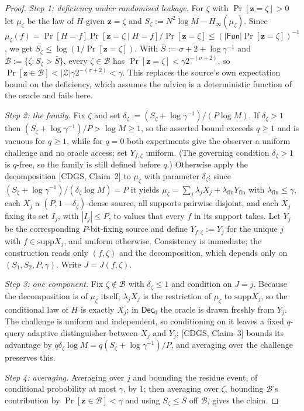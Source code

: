 \documentclass{aicr-solution}
\newcommand{\Fun}{\mathsf{Fun}}
\newcommand{\Dec}{\mathsf{Dec}}
\newcommand{\Prob}[1]{\Pr\!\left[#1\right]}
\newcommand{\vz}{\mathbf{z}}
\newcommand{\supp}{\mathrm{supp}}
\begin{document}
\begin{proof}
\emph{Step 1: deficiency under randomised leakage.} For $\zeta$ with
$\Prob{\vz=\zeta}>0$ let $\mu_\zeta$ be the law of $H$ given $\vz=\zeta$ and
$S_\zeta:=N^{2}\log M-H_\infty(\mu_\zeta)$. Since
$\mu_\zeta(f)=\Prob{H=f}\Prob{\vz=\zeta\mid H=f}/\Prob{\vz=\zeta}\le(|\Fun|\Prob{\vz=\zeta})^{-1}$,
we get $S_\zeta\le\log(1/\Prob{\vz=\zeta})$. With
$\bar S:=\sigma+2+\log\gamma^{-1}$ and $\mathcal B:=\{\zeta:S_\zeta>\bar S\}$,
every $\zeta\in\mathcal B$ has $\Prob{\vz=\zeta}<\gamma2^{-(\sigma+2)}$, so
$\Prob{\vz\in\mathcal B}<|\mathcal Z|\gamma2^{-(\sigma+2)}<\gamma$. This replaces
the source's own expectation bound on the deficiency, which assumes the advice is
a deterministic function of the oracle and fails here.

\emph{Step 2: the family.} Fix $\zeta$ and set
$\delta_\zeta:=(S_\zeta+\log\gamma^{-1})/(P\log M)$. If $\delta_\zeta>1$ then
$(S_\zeta+\log\gamma^{-1})/P>\log M\ge1$, so the asserted bound exceeds
$q\ge1$ and is vacuous for $q\ge1$, while for $q=0$ both experiments give the
observer a uniform challenge and no oracle access; set $Y_{f,\zeta}$ uniform.
(The governing condition $\delta_\zeta>1$ is $q$-free, so the family is still
defined before $q$.) Otherwise apply the decomposition [CDGS, Claim~2] to
$\mu_\zeta$ with parameter $\delta_\zeta$; since
$(S_\zeta+\log\gamma^{-1})/(\delta_\zeta\log M)=P$ it yields
$\mu_\zeta=\sum_j\lambda_jX_j+\lambda_{\mathrm{fin}}Y_{\mathrm{fin}}$ with
$\lambda_{\mathrm{fin}}\le\gamma$, each $X_j$ a $(P,1-\delta_\zeta)$-dense
source, all supports pairwise disjoint, and each $X_j$ fixing its set $I_j$,
with $|I_j|\le P$, to values that every $f$ in its support takes. Let $Y_j$ be the
corresponding $P$-bit-fixing source and define $Y_{f,\zeta}:=Y_j$ for the unique
$j$ with $f\in\supp X_j$, and uniform otherwise. Consistency is immediate; the
construction reads only $(f,\zeta)$ and the decomposition, which depends only on
$(S_1,S_2,P,\gamma)$. Write $J=J(f,\zeta)$.

\emph{Step 3: one component.} Fix $\zeta\notin\mathcal B$ with $\delta_\zeta\le1$
and condition on $J=j$. Because the decomposition is of $\mu_\zeta$ itself,
$\lambda_jX_j$ is the restriction of $\mu_\zeta$ to $\supp X_j$, so the
conditional law of $H$ is exactly $X_j$; in $\Dec_0$ the oracle is drawn freshly
from $Y_j$. The challenge is uniform and independent, so conditioning on it
leaves a fixed $q$-query adaptive distinguisher between $X_j$ and $Y_j$;
[CDGS, Claim~3] bounds its advantage by
$q\delta_\zeta\log M=q(S_\zeta+\log\gamma^{-1})/P$, and averaging over the
challenge preserves this.

\emph{Step 4: averaging.} Averaging over $j$ and bounding the residue event, of
conditional probability at most $\gamma$, by $1$; then averaging over $\zeta$,
bounding $\mathcal B$'s contribution by $\Prob{\vz\in\mathcal B}<\gamma$ and
using $S_\zeta\le\bar S$ off $\mathcal B$, gives the claim.
\end{proof}
\end{document}
